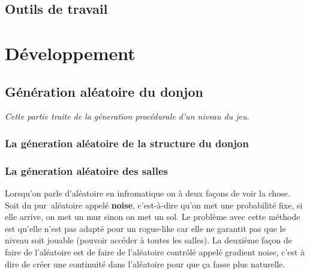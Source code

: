 \documentclass[a4paper,11pt]{article}
\begin{document}
\subsection{Outils de travail}


\newpage
\section{Développement}

\subsection{Génération aléatoire du donjon}
\textit{Cette partie traite de la géneration procédurale d'un niveau du jeu.}
\subsubsection{La géneration aléatoire de la structure du donjon}

\subsubsection{La géneration aléatoire des salles}
Lorsqu'on parle d'aléatoire en infromatique on à deux façons de voir la chose. Soit du \guillemotleft pur\guillemotright \ aléatoire appelé \textbf{noise}, c'est-à-dire qu'on met une probabilité fixe, si elle arrive, on met un mur sinon on met un sol. Le problème avec cette méthode est qu'elle n'est pas adapté pour un rogue-like car elle ne garantit pas que le niveau soit jouable (pouvoir accéder à toutes les salles). 
La deuxième façon de faire de l'aléatoire est de faire de l'aléatoire contrôlé appelé gradient noise, c'est à dire de créer une continuité dans l'aléatoire pour que ça fasse plus naturelle.\\\\
\end{document}
